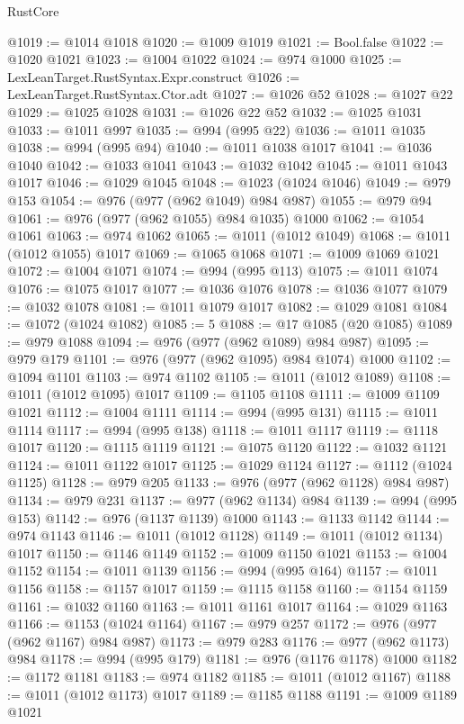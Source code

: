 \begin{lexlean}{RustCore}
\begin{coremodule}
@1019 := @1014 @1018
@1020 := @1009 @1019
@1021 := Bool.false
@1022 := @1020 @1021
@1023 := @1004 @1022
@1024 := @974 @1000
@1025 := LexLeanTarget.RustSyntax.Expr.construct
@1026 := LexLeanTarget.RustSyntax.Ctor.adt
@1027 := @1026 @52
@1028 := @1027 @22
@1029 := @1025 @1028
@1031 := @1026 @22 @52
@1032 := @1025 @1031
@1033 := @1011 @997
@1035 := @994 (@995 @22)
@1036 := @1011 @1035
@1038 := @994 (@995 @94)
@1040 := @1011 @1038 @1017
@1041 := @1036 @1040
@1042 := @1033 @1041
@1043 := @1032 @1042
@1045 := @1011 @1043 @1017
@1046 := @1029 @1045
@1048 := @1023 (@1024 @1046)
@1049 := @979 @153
@1054 := @976 (@977 (@962 @1049) @984 @987)
@1055 := @979 @94
@1061 := @976 (@977 (@962 @1055) @984 @1035) @1000
@1062 := @1054 @1061
@1063 := @974 @1062
@1065 := @1011 (@1012 @1049)
@1068 := @1011 (@1012 @1055) @1017
@1069 := @1065 @1068
@1071 := @1009 @1069 @1021
@1072 := @1004 @1071
@1074 := @994 (@995 @113)
@1075 := @1011 @1074
@1076 := @1075 @1017
@1077 := @1036 @1076
@1078 := @1036 @1077
@1079 := @1032 @1078
@1081 := @1011 @1079 @1017
@1082 := @1029 @1081
@1084 := @1072 (@1024 @1082)
@1085 := 5
@1088 := @17 @1085 (@20 @1085)
@1089 := @979 @1088
@1094 := @976 (@977 (@962 @1089) @984 @987)
@1095 := @979 @179
@1101 := @976 (@977 (@962 @1095) @984 @1074) @1000
@1102 := @1094 @1101
@1103 := @974 @1102
@1105 := @1011 (@1012 @1089)
@1108 := @1011 (@1012 @1095) @1017
@1109 := @1105 @1108
@1111 := @1009 @1109 @1021
@1112 := @1004 @1111
@1114 := @994 (@995 @131)
@1115 := @1011 @1114
@1117 := @994 (@995 @138)
@1118 := @1011 @1117
@1119 := @1118 @1017
@1120 := @1115 @1119
@1121 := @1075 @1120
@1122 := @1032 @1121
@1124 := @1011 @1122 @1017
@1125 := @1029 @1124
@1127 := @1112 (@1024 @1125)
@1128 := @979 @205
@1133 := @976 (@977 (@962 @1128) @984 @987)
@1134 := @979 @231
@1137 := @977 (@962 @1134) @984
@1139 := @994 (@995 @153)
@1142 := @976 (@1137 @1139) @1000
@1143 := @1133 @1142
@1144 := @974 @1143
@1146 := @1011 (@1012 @1128)
@1149 := @1011 (@1012 @1134) @1017
@1150 := @1146 @1149
@1152 := @1009 @1150 @1021
@1153 := @1004 @1152
@1154 := @1011 @1139
@1156 := @994 (@995 @164)
@1157 := @1011 @1156
@1158 := @1157 @1017
@1159 := @1115 @1158
@1160 := @1154 @1159
@1161 := @1032 @1160
@1163 := @1011 @1161 @1017
@1164 := @1029 @1163
@1166 := @1153 (@1024 @1164)
@1167 := @979 @257
@1172 := @976 (@977 (@962 @1167) @984 @987)
@1173 := @979 @283
@1176 := @977 (@962 @1173) @984
@1178 := @994 (@995 @179)
@1181 := @976 (@1176 @1178) @1000
@1182 := @1172 @1181
@1183 := @974 @1182
@1185 := @1011 (@1012 @1167)
@1188 := @1011 (@1012 @1173) @1017
@1189 := @1185 @1188
@1191 := @1009 @1189 @1021

\end{coremodule}
\end{lexlean}

